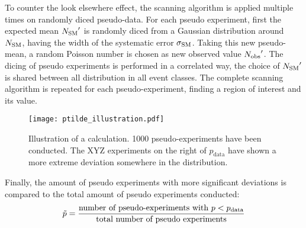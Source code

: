 To counter the look elsewhere effect, the scanning algorithm is applied multiple times on randomly diced pseudo-data. For each pseudo experiment, first the expected mean ${N_\mathrm{SM}}'$ is randomly diced from a Gaussian distribution around ${N_\mathrm{SM}}$, having the width of the systematic error ${\sigma_\mathrm{SM}}$. Taking this new pseudo-mean, a random Poisson number is chosen as new observed value ${N_\mathrm{obs}}'$. The dicing of pseudo experiments is performed in a correlated way, the choice of ${N_\mathrm{SM}}'$ is shared between all distribution in all event classes. The complete scanning algorithm is repeated for each pseudo-experiment, finding a region of interest and its \p value.
\begin{figure}[htbp]
	\centering
	\texttt{[image: ptilde\_illustration.pdf]}
	\caption{Illustration of a \ptilde calculation. 1000 pseudo-experiments have been conducted. The XYZ experiments on the right of $p_\mathrm{data}$ have shown a more extreme deviation somewhere in the distribution.}
	\label{fig:ptilde_illustration}
\end{figure}
Finally, the amount of pseudo experiments with more significant deviations is compared to the total amount of pseudo experiments conducted:
\begin{equation}
	\tilde{p} = \frac{\text{number of pseudo-experiments with } p < p_\mathrm{data}}{\text{total number of pseudo experiments}}
\end{equation}



